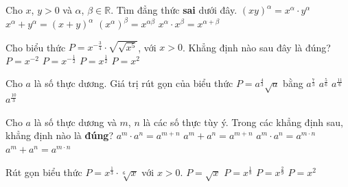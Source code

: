 \begin{ex}%
	Cho $x$, $y>0$ và $\alpha$, $\beta \in \mathbb{R}$. Tìm  đẳng thức {\bf sai} dưới đây.
	 \choice
		{$(xy)^\alpha = x^\alpha \cdot  y^\alpha$}
		{\True $x^\alpha + y^\alpha =  (x+y)^\alpha$}
		{$(x^\alpha)^\beta = x^{\alpha \beta}$} 
		{$x^\alpha  \cdot x^\beta = x^{\alpha+\beta}$}
\end{ex}

\begin{ex}%
	Cho biểu thức $P=x^{-\tfrac{3}{4}}\cdot \sqrt{\sqrt{x^5}}$, với $x > 0$. Khẳng định nào sau  đây là đúng?
	\choice 
		{$P=x^{-2}$} 
		{$P=x^{-\tfrac{1}{2}}$} 
		 {\True$P=x^{\tfrac{1}{2}}$}
		 {$P=x^2$}
\end{ex}

\begin{ex}%
	Cho $a$ là số thực dương. Giá  trị rút gọn của biểu thức $ P=a^{\frac{4}{3}}\sqrt{a}$ bằng
	 \choice
		{$a^{\frac{7}{3}}$} 
		{$a^{\frac{5}{6}}$} 
		 {\True $a^{\frac{11}{6}}$}
		{$a^{\frac{10}{3}}$} 
\end{ex}

\begin{ex}%
	 Cho $a$ là số thực dương và $m$, $n$ là các số thực tùy ý. Trong các khẳng định sau, khẳng định nào là \textbf{đúng}?
	\choice 
		{\True  $a^m \cdot a^n=a^{m+n}$}
		 {$a^m+a^n=a^{m+n}$}
		{$a^m \cdot a^n=a^{m \cdot n}$} 
		{$a^m+a^n=a^{m \cdot n}$} 
\end{ex}

\begin{ex}%
	[Mã 110  2017] Rút gọn biểu thức $P=x^{\frac{1}{3}}\cdot \sqrt[6]{x}$ với $x>0$.
	 \choice
		{\True $P=\sqrt{x}$} 
		{$P=x^{\frac{1}{8}}$} 
		 {$P=x^{\frac{2}{9}}$}
		 {$P=x^2$}
\end{ex}

